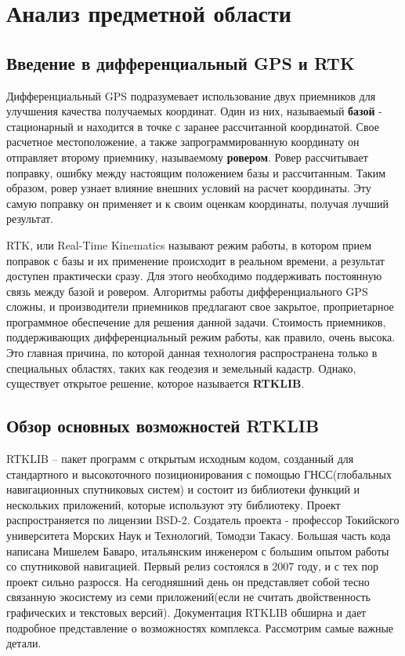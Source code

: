\chapter{Анализ предметной области} \label{chapt1}

\section{Введение в дифференциальный GPS и RTK} \label{sect1_1}

Дифференциальный GPS подразумевает использование двух приемников для улучшения качества получаемых координат. Один из них, называемый \textbf{базой} - стационарный и находится в точке с заранее рассчитанной координатой. Свое расчетное местоположение, а также запрограммированную координату он отправляет второму приемнику, называемому \textbf{ровером}. Ровер рассчитывает поправку, ошибку между настоящим положением базы и рассчитанным. Таким образом, ровер узнает влияние внешних условий на расчет координаты. Эту самую поправку он применяет и к своим оценкам координаты, получая лучший результат.

RTK, или Real-Time Kinematics называют режим работы, в котором прием поправок с базы и их применение происходит в реальном времени, а результат доступен практически сразу. Для этого необходимо поддерживать постоянную связь между базой и ровером. Алгоритмы работы дифференциального GPS сложны, и производители приемников предлагают свое закрытое, проприетарное программное обеспечение для решения данной задачи. Стоимость приемников, поддерживающих дифференциальный режим работы, как правило, очень высока. Это главная причина, по которой данная технология распространена только в специальных областях, таких как геодезия и земельный кадастр. Однако, существует открытое решение, которое называется \textbf{RTKLIB}.

\section{Обзор основных возможностей RTKLIB} \label{sect1_2}

RTKLIB – пакет программ с открытым исходным кодом, созданный для стандартного и высокоточного позиционирования с помощью ГНСС(глобальных навигационных спутниковых систем) и состоит из библиотеки функций и нескольких приложений, которые используют эту библиотеку. Проект распространяется по лицензии BSD-2. Создатель проекта -  профессор Токийского университета Морских Наук и Технологий, Томодзи Такасу. Большая часть кода написана Мишелем Баваро, итальянским инженером с большим опытом работы со спутниковой навигацией. Первый релиз состоялся в 2007 году, и с тех пор проект сильно разросся. На сегодняшний день он представляет собой тесно связанную экосистему из семи приложений(если не считать двойственность графических и текстовых версий). Документация RTKLIB \cite{rtklib-docs} обширна и дает подробное представление о возможностях комплекса. Рассмотрим самые важные детали.

